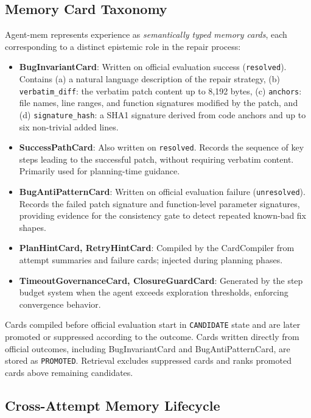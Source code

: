 \documentclass[runningheads]{llncs}
\begin{document}
\subsection{Memory Card Taxonomy}

Agent-mem represents experience as \emph{semantically typed memory cards}, each corresponding to a distinct epistemic role in the repair process:

\begin{itemize}
    \item \textbf{BugInvariantCard}: Written on official evaluation success (\texttt{resolved}). Contains (a) a natural language description of the repair strategy, (b) \texttt{verbatim\_diff}: the verbatim patch content up to 8,192 bytes, (c) \texttt{anchors}: file names, line ranges, and function signatures modified by the patch, and (d) \texttt{signature\_hash}: a SHA1 signature derived from code anchors and up to six non-trivial added lines.

    \item \textbf{SuccessPathCard}: Also written on \texttt{resolved}. Records the sequence of key steps leading to the successful patch, without requiring verbatim content. Primarily used for planning-time guidance.

    \item \textbf{BugAntiPatternCard}: Written on official evaluation failure (\texttt{unresolved}). Records the failed patch signature and function-level parameter signatures, providing evidence for the consistency gate to detect repeated known-bad fix shapes.

    \item \textbf{PlanHintCard, RetryHintCard}: Compiled by the CardCompiler from attempt summaries and failure cards; injected during planning phases.

    \item \textbf{TimeoutGovernanceCard, ClosureGuardCard}: Generated by the step budget system when the agent exceeds exploration thresholds, enforcing convergence behavior.
\end{itemize}

Cards compiled before official evaluation start in \texttt{CANDIDATE} state and are later promoted or suppressed according to the outcome. Cards written directly from official outcomes, including BugInvariantCard and BugAntiPatternCard, are stored as \texttt{PROMOTED}. Retrieval excludes suppressed cards and ranks promoted cards above remaining candidates.

\subsection{Cross-Attempt Memory Lifecycle}
\end{document}
